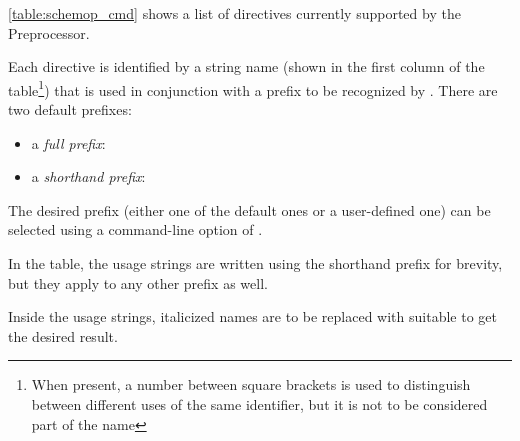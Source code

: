\autoref{table:schemop_cmd} shows a list of directives currently
supported by the \ScheMo{} Preprocessor.

\beforelist* Each directive is identified by a string name (shown in the first
column of the table\footnote{When present, a number between square
brackets is used to distinguish between different uses of the same
identifier, but it is not to be considered part of the name}) that is
used in conjunction with a prefix to be recognized by .
There are two default prefixes:
\begin{itemize}
  \item a \textit{full prefix}: 
  \item a \textit{shorthand prefix}: 
\end{itemize}
\afterlist*
The desired prefix (either one of the default ones or a user-defined
one) can be selected using a command-line option of .

In the table, the usage strings are written using the shorthand
prefix for brevity, but they apply to any other prefix as well.

Inside the usage strings, italicized names are to be replaced with
suitable to get the desired result. 

